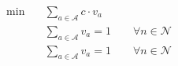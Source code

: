 \begin{align}
  \min\quad & \sum_{a \in \mathcal{A}} c \cdot v_{a} \tag{objective} \\
  & \sum_{a \in \mathcal{A}} v_{a} = 1 \qquad \forall n \in \mathcal{N} \tag{incoming\_degree} \\
  & \sum_{a \in \mathcal{A}} v_{a} = 1 \qquad \forall n \in \mathcal{N} \tag{outgoing\_degree} \\
\end{align}
